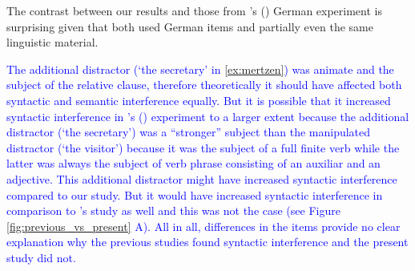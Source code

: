 \documentclass[a4paper, man, floatsintext]{apa7}
\begin{document}
{The contrast between our results and those from  \citeauthor{mertzen}'s (\citeyear{mertzen}) German experiment is surprising given that both used German items and partially even the same linguistic material. 

\textcolor{blue}{The additional distractor (`the secretary' in \ref{ex:mertzen}) was animate and the subject of the relative clause, therefore theoretically it should have affected both syntactic and semantic interference equally. But it is possible that it increased syntactic interference in \citeauthor{mertzen}'s (\citeyear{mertzen}) experiment to a larger extent because the additional distractor (`the secretary') was a ``stronger'' subject than the manipulated distractor (`the visitor') because it was the subject of a full finite verb while the latter was always the subject of verb phrase consisting of an auxiliar and an adjective. This additional distractor might have increased syntactic interference compared to our study. But it would have increased syntactic interference in comparison to \citeauthor{vandyke07}'s study as well and this was not the case (see Figure \ref{fig:previous_vs_present} A).}\label{items_mertzen} \textcolor{blue}{All in all, differences in the items provide no clear explanation why the previous studies found syntactic interference and the present study did not.}

}
\end{document}
